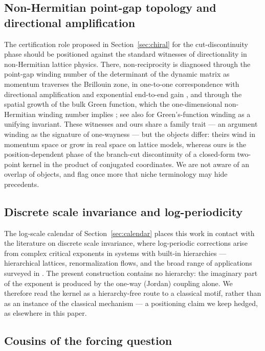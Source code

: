 \documentclass[11pt,a4paper]{article}
\begin{document}
\subsection{Non-Hermitian point-gap topology and directional amplification}
\label{sec:nhtopo}

The certification role proposed in Section~\ref{sec:chiral} for the
cut-discontinuity phase should be positioned against the standard
witnesses of directionality in non-Hermitian lattice physics. There,
non-reciprocity is diagnosed through the point-gap winding number of the
determinant of the dynamic matrix as momentum traverses the Brillouin
zone, in one-to-one correspondence with directional amplification and
exponential end-to-end gain \cite{Wanjura2020}, and through the spatial
growth of the bulk Green function, which the one-dimensional
non-Hermitian winding number implies \cite{Zirnstein2021}; see
also \cite{HuWang2023} for Green's-function winding as a unifying
invariant. These witnesses and ours share a family trait --- an argument
winding as the signature of one-wayness --- but the objects differ:
theirs wind in momentum space or grow in real space on lattice models,
whereas ours is the position-dependent phase of the branch-cut
discontinuity of a closed-form two-point kernel in the product of
conjugated coordinates. We are not aware of an overlap of objects, and
flag once more that niche terminology may hide precedents.

\subsection{Discrete scale invariance and log-periodicity}
\label{sec:dsi}

The log-scale calendar of Section~\ref{sec:calendar} places this work in
contact with the literature on discrete scale invariance, where
log-periodic corrections arise from complex critical exponents
\cite{Derrida1984,Sornette1998} in systems with built-in hierarchies ---
hierarchical lattices, renormalization flows, and the broad range of
applications surveyed in \cite{Sornette1998}. The present construction
contains no hierarchy: the imaginary part of the exponent is produced by
the one-way (Jordan) coupling alone. We therefore read the kernel as a
hierarchy-free route to a classical motif, rather than as an instance of
the classical mechanism --- a positioning claim we keep hedged, as
elsewhere in this paper.

\subsection{Cousins of the forcing question}
\end{document}
